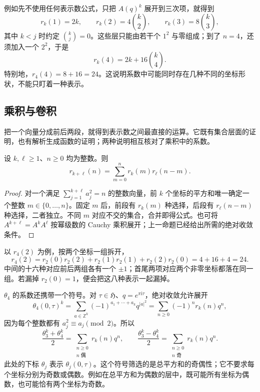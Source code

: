 例如先不使用任何表示数公式，只把 \(A(q)^k\) 展开到三次项，就得到
\[
 r_k(1)=2k,\qquad
 r_k(2)=4\binom{k}{2},\qquad
 r_k(3)=8\binom{k}{3},
\]
其中 \(k<j\) 时约定 \(\binom{k}{j}=0\)。这些层只能由若干个 \(1^2\) 与零组成；到了 \(n=4\)，还须加入一个 \(2^2\)，于是
\[
 r_k(4)=2k+16\binom{k}{4}.
\]
特别地，\(r_4(4)=8+16=24\)。这说明系数中可能同时存在几种不同的坐标形状，不能只盯着一种表示。

\subsection{乘积与卷积}
\label{b3:subsec:240302}

把一个向量分成前后两段，就得到表示数之间最直接的运算。它既有集合层面的证明，也有解析生成函数的证明；两种说明相互核对了乘积中的系数。

\begin{proposition}[平方和表示数的卷积]\label{b3:prop:24-square-convolution}
设 \(k,\ell\ge1\)、\(n\ge0\) 均为整数。则
\[
 r_{k+\ell}(n)=\sum_{m=0}^{n}r_k(m)r_\ell(n-m).
\]
\end{proposition}
\begin{proof}
对一个满足 \(\sum_{j=1}^{k+\ell}a_j^2=n\) 的整数向量，前 \(k\) 个坐标的平方和唯一确定一个整数 \(m\in\{0,\ldots,n\}\)。固定 \(m\) 后，前段有 \(r_k(m)\) 种选择，后段有 \(r_\ell(n-m)\) 种选择，二者独立。不同 \(m\) 对应不交的集合，合并即得公式。也可将
\(A^{k+\ell}=A^kA^\ell\) 按幂级数的 Cauchy 乘积展开；上一命题已经给出所需的绝对收敛条件。
\end{proof}

以 \(r_4(2)\) 为例，按两个坐标一组拆开，
\[
 r_4(2)=r_2(0)r_2(2)+r_2(1)r_2(1)+r_2(2)r_2(0)
       =4+16+4=24.
\]
中间的十六种对应前后两组各有一个 \(\pm1\)；首尾两项对应两个非零坐标都落在同一组。若漏掉 \(r_2(0)=1\)，便会把这八种表示一起漏掉。

\ProseParagraphBreak

\(\theta_4\) 的系数还携带一个符号。对 \(\tau\in\mathfrak H\)、\(q=e^{\pi\mathrm{i}\tau}\)，绝对收敛允许展开
\[
 \theta_4(0,\tau)^k
 =\sum_{a\in\mathbb Z^k}(-1)^{a_1+\cdots+a_k}q^{|a|^2}
 =\sum_{n\ge0}(-1)^n r_k(n)q^n,
\]
因为每个整数都有 \(a_j^2\equiv a_j\pmod2\)。所以
\[
 \frac{\theta_3^k+\theta_4^k}{2}
   =\sum_{\substack{n\ge0\\n\text{ 偶}}}r_k(n)q^n,\qquad
 \frac{\theta_3^k-\theta_4^k}{2}
   =\sum_{\substack{n\ge0\\n\text{ 奇}}}r_k(n)q^n.
\]
此处的下标 \(\theta_j\) 表示 \(\theta_j(0,\tau)\)。这个符号筛选的是总平方和的奇偶性；它不要求每个坐标分别为奇数或偶数。例如在总平方和为偶数的层中，既可能所有坐标为偶数，也可能恰有两个坐标为奇数。

